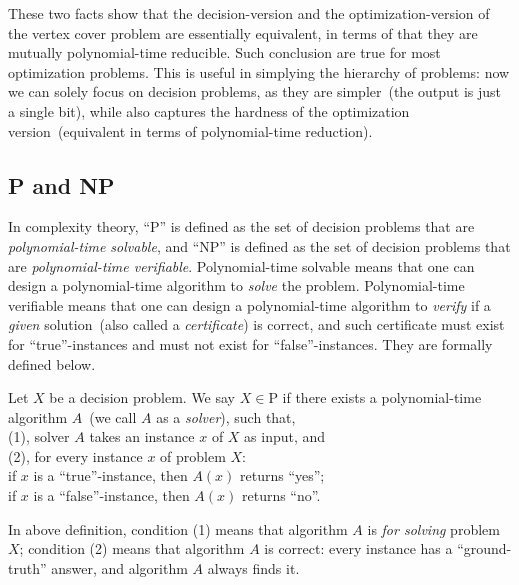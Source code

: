 These two facts show that the decision-version and the optimization-version
of the vertex cover problem are essentially equivalent, in terms of that they are mutually polynomial-time reducible.
Such conclusion are true for most optimization problems.
This is useful in simplying the hierarchy of problems: now we can solely focus on decision problems, as they are simpler~(the output is just a single bit),
while also captures the hardness of the optimization version~(equivalent in terms of polynomial-time reduction).

\subsection*{P and NP}

In complexity theory, ``P'' is defined as the set of decision problems that are \emph{polynomial-time solvable}, 
and ``NP'' is defined as the set of decision problems that are \emph{polynomial-time verifiable}. 
Polynomial-time solvable means that one can design a polynomial-time algorithm to \emph{solve} the problem.
Polynomial-time verifiable means that one can design a polynomial-time algorithm to \emph{verify}
if a \emph{given} solution~(also called a \emph{certificate}) is correct,  
and such certificate must exist for ``true''-instances and must not exist for ``false''-instances.
They are formally defined below.


\begin{definition}[P]
Let $X$ be a decision problem. We say $X\in \textrm{P}$ if there exists a polynomial-time algorithm $A$~(we call $A$ as a \emph{solver}), such that,\\
	(1), solver $A$ takes an instance $x$ of $X$ as input, and \\
	(2), for every instance $x$ of problem $X$: \\
	\hspace*{0.2cm} if $x$ is a ``true''-instance, then $A(x)$ returns ``yes'';\\
	\hspace*{0.2cm} if $x$ is a ``false''-instance, then $A(x)$ returns ``no''.
\end{definition}

In above definition, condition (1) means that algorithm $A$ is \emph{for solving} problem $X$;
condition (2) means that algorithm $A$ is correct: every instance has a ``ground-truth'' answer, and
algorithm $A$ always finds it.

